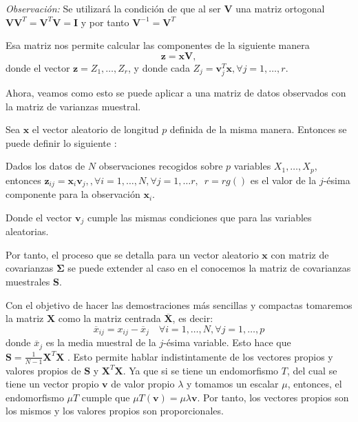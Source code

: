 \noindent \emph{Observación: }Se utilizará la condición de que al ser $\mathbf{V}$ una matriz ortogonal $\mathbf{VV}^T=\mathbf{V}^T\mathbf{V}=\mathbf{I}$ y por tanto $\mathbf{V}^{-1}=\mathbf{V}^T$

\noindent Esa matriz nos permite calcular las componentes de la siguiente manera
\begin{equation}
\mathbf{z}=\mathbf{x} \mathbf{V},
\end{equation} 
\noindent donde el vector $\mathbf{z}=Z_1,\ldots, Z_r$, y donde cada $Z_j=\mathbf{v}_j^T\mathbf{x}, \forall j=1,\ldots, r$.

\noindent Ahora, veamos como esto se puede aplicar a una matriz de datos observados con la matriz de varianzas muestral.

\noindent Sea $\mathbf{x}$ el vector aleatorio de longitud $p$ definida de la misma manera. Entonces se puede definir lo siguiente :

\begin{defi}
Dados los datos de $N$ observaciones recogidos sobre $p$ variables $X_1,\ldots, X_p$, entonces $\mathbf{z}_{ij}=\mathbf{x}_i\mathbf{v}_j, ,\forall i=1,\ldots, N,\forall j=1,\ldots r, \enspace r=rg(\mathbf{})$ es el valor de la $j$-ésima componente para la observación $\mathbf{x}_i$. 

\noindent Donde el vector $\mathbf{v}_j$ cumple las mismas condiciones que para las variables aleatorias. 
\end{defi}

\noindent Por tanto, el proceso que se detalla para un vector aleatorio $\mathbf{x}$ con matriz de covarianzas $\mathbf{\Sigma}$ se puede extender al caso en el conocemos la matriz de covarianzas muestrales \textbf{S}.

\noindent Con el objetivo de hacer las demostraciones más sencillas y compactas tomaremos la matriz $\textbf{X}$ como la matriz centrada $\overline{\textbf{X}}$, es decir: 
\begin{equation}
\overline{x}_{ij}=x_{ij}-\overline{x}_j \quad \forall i=1,\ldots,N,\forall j=1,\ldots,p
\end{equation}
donde $\overline{x}_j$ es la media muestral de la $j$-ésima variable. Esto hace que $\textbf{S}=\frac{1}{N-1}\textbf{X}^T\textbf{X}$ \cite{Peña 2002}. Esto permite hablar indistintamente de los vectores propios y valores propios de $\mathbf{S}$ y $\mathbf{X}^T\mathbf{X}$. Ya que si se tiene un endomorfismo $T$, del cual se tiene un vector propio $\mathbf{v}$ de valor propio $\lambda$ y tomamos un escalar $\mu$, entonces, el endomorfismo $\mu T$ cumple que $\mu T(\mathbf{v})=\mu \lambda \mathbf{v}$. Por tanto, los vectores propios son los mismos y los valores propios son proporcionales. 

